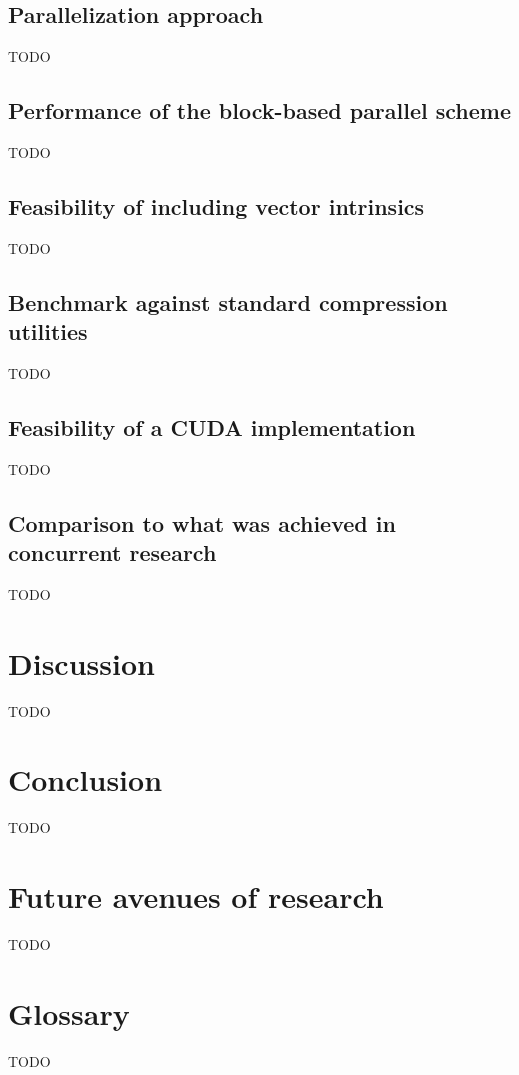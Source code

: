 \subsection{Parallelization approach}
{\color{red}TODO}
\subsection{Performance of the block-based parallel scheme}
{\color{red}TODO}
\subsection{Feasibility of including vector intrinsics}
{\color{red}TODO}
\subsection{Benchmark against standard compression utilities}
{\color{red}TODO}
\subsection{Feasibility of a CUDA implementation}
{\color{red}TODO}
\subsection{Comparison to what was achieved in concurrent research}
{\color{red}TODO}
\section{Discussion}
{\color{red}TODO}
\section{Conclusion}
{\color{red}TODO}
\section{Future avenues of research}
{\color{red}TODO}
\section{Glossary}
{\color{red}TODO}


